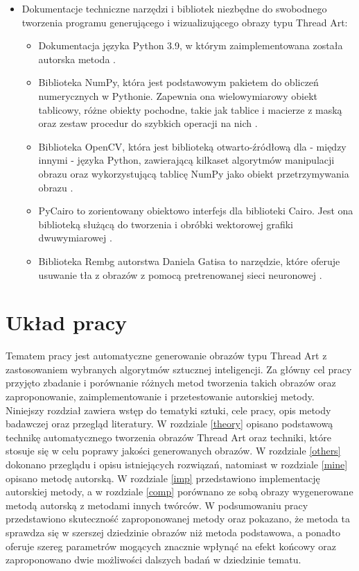 \begin{itemize}
\begin{itemize}
        \end{itemize}
        \item Dokumentacje techniczne narzędzi i bibliotek niezbędne do swobodnego tworzenia programu generującego i wizualizującego obrazy typu Thread Art:
        \begin{itemize}
            \item Dokumentacja języka Python 3.9, w którym zaimplementowana została autorska metoda \cite{python39}.
            \item Biblioteka NumPy, która jest podstawowym pakietem do obliczeń numerycznych w Pythonie. Zapewnia ona wielowymiarowy obiekt tablicowy, różne obiekty pochodne, takie jak tablice i macierze z maską oraz zestaw procedur do szybkich operacji na nich \cite{numpy}.
            \item Biblioteka OpenCV, która jest biblioteką otwarto-źródłową dla - między innymi - języka Python, zawierającą kilkaset algorytmów manipulacji obrazu oraz wykorzystującą tablicę NumPy jako obiekt przetrzymywania obrazu \cite{opencv}.
            \item PyCairo to zorientowany obiektowo interfejs dla biblioteki Cairo. Jest ona biblioteką służącą do tworzenia i obróbki wektorowej grafiki dwuwymiarowej \cite{pycairo}.
            \item Biblioteka Rembg autorstwa Daniela Gatisa to narzędzie, które oferuje usuwanie tła z obrazów z pomocą pretrenowanej sieci neuronowej \cite{rembg}.
        \end{itemize}
    \end{itemize}
    
    \section{Układ pracy} \label{intro-layout}
    Tematem pracy jest automatyczne generowanie obrazów typu Thread Art z zastosowaniem wybranych algorytmów sztucznej inteligencji. Za główny cel pracy przyjęto zbadanie i porównanie różnych metod tworzenia takich obrazów oraz zaproponowanie, zaimplementowanie i przetestowanie autorskiej metody. Niniejszy rozdział zawiera wstęp do tematyki sztuki, cele pracy, opis metody badawczej oraz przegląd literatury. W rozdziale \ref{theory} opisano podstawową technikę automatycznego tworzenia obrazów Thread Art oraz techniki, które stosuje się w celu poprawy jakości generowanych obrazów. W rozdziale \ref{others} dokonano przeglądu i opisu istniejących rozwiązań, natomiast w rozdziale \ref{mine} opisano metodę autorską. W rozdziale \ref{imp} przedstawiono implementację autorskiej metody, a w rozdziale \ref{comp} porównano ze sobą obrazy wygenerowane metodą autorską z metodami innych twórców. W podsumowaniu pracy przedstawiono skuteczność zaproponowanej metody oraz pokazano, że metoda ta sprawdza się w szerszej dziedzinie obrazów niż metoda podstawowa, a ponadto oferuje szereg parametrów mogących znacznie wpłynąć na efekt końcowy oraz zaproponowano dwie możliwości dalszych badań w dziedzinie tematu. 

